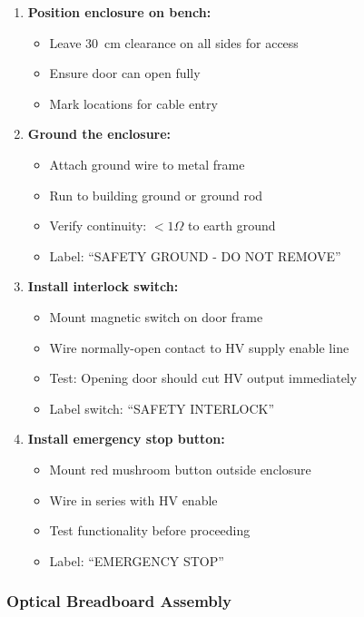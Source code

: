 \documentclass[11pt]{article}
\begin{document}
\begin{enumerate}
\item \textbf{Position enclosure on bench:}
  \begin{itemize}
  \item Leave 30~cm clearance on all sides for access
  \item Ensure door can open fully
  \item Mark locations for cable entry
  \end{itemize}

\item \textbf{Ground the enclosure:}
  \begin{itemize}
  \item Attach ground wire to metal frame
  \item Run to building ground or ground rod
  \item Verify continuity: $<1\Omega$ to earth ground
  \item Label: ``SAFETY GROUND - DO NOT REMOVE''
  \end{itemize}

\item \textbf{Install interlock switch:}
  \begin{itemize}
  \item Mount magnetic switch on door frame
  \item Wire normally-open contact to HV supply enable line
  \item Test: Opening door should cut HV output immediately
  \item Label switch: ``SAFETY INTERLOCK''
  \end{itemize}

\item \textbf{Install emergency stop button:}
  \begin{itemize}
  \item Mount red mushroom button outside enclosure
  \item Wire in series with HV enable
  \item Test functionality before proceeding
  \item Label: ``EMERGENCY STOP''
  \end{itemize}
\end{enumerate}

\subsubsection{Optical Breadboard Assembly}
\end{document}
